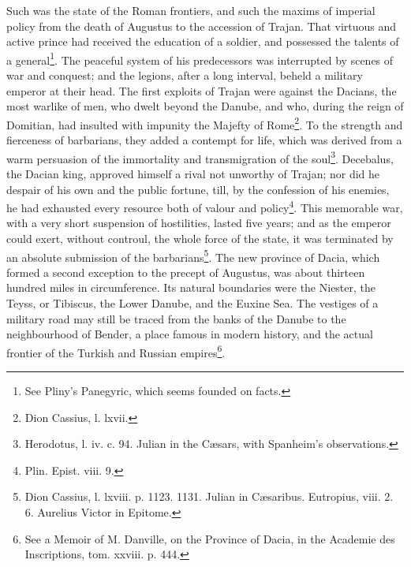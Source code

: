 Such was the state of the Roman frontiers, and such the maxims of imperial policy from the death of Augustus to the accession of Trajan. That virtuous and active prince had received the education of a soldier, and possessed the talents of a general\footnote{See Pliny’s Panegyric, which seems founded on facts.}. The peaceful system of his predecessors was interrupted by scenes of war and conquest; and the legions, after a long interval, beheld a military emperor at their head. The first exploits of Trajan were against the Dacians, the most warlike of men, who dwelt beyond the Danube, and who, during the reign of Domitian, had insulted with impunity the Majefty of Rome\footnote{Dion Cassius, l. lxvii.}. To the strength and fierceness of barbarians, they added a contempt for life, which was derived from a warm persuasion of the immortality and transmigration of the soul\footnote{Herodotus, l. iv. c. 94. Julian in the Cæsars, with Spanheim’s observations.}. Decebalus, the Dacian king, approved himself a rival not unworthy of Trajan; nor did he despair of his own and the public fortune, till, by the confession of his enemies, he had exhausted every resource both of valour and policy\footnote{Plin. Epist. viii. 9.}. This memorable war, with a very short suspension of hostilities, lasted five years; and as the emperor could exert, without controul, the whole force of the state, it was terminated by an absolute submission of the barbarians\footnote{Dion Cassius, l. lxviii. p. 1123. 1131. Julian in Cæsaribus. Eutropius, viii. 2. 6. Aurelius Victor in Epitome.}. The new province of Dacia, which formed a second exception to the precept of Augustus, was about thirteen hundred  miles in circumference. Its natural boundaries were the Niester, the Teyss, or Tibiscus, the Lower Danube, and the Euxine Sea. The vestiges of a military road may still be traced from the banks of the Danube to the neighbourhood of Bender, a place famous in modern history, and the actual frontier of the Turkish and Russian empires\footnote{See a Memoir of M. Danville, on the Province of Dacia, in the Academie des Inscriptions, tom. xxviii. p. 444.}.



